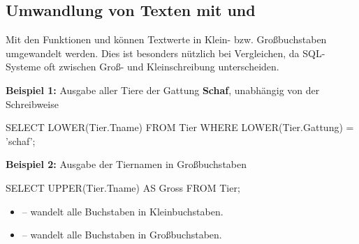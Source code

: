 \subsection{Umwandlung von Texten mit  und }

Mit den Funktionen  und  können Textwerte in Klein- bzw. Großbuchstaben umgewandelt werden. 
Dies ist besonders nützlich bei Vergleichen, da SQL-Systeme oft zwischen Groß- und Kleinschreibung unterscheiden.

\textbf{Beispiel 1:} Ausgabe aller Tiere der Gattung \textbf{Schaf}, unabhängig von der Schreibweise
    \begin{sql}
        SELECT LOWER(Tier.Tname)
            FROM Tier
            WHERE LOWER(Tier.Gattung) = 'schaf';
    \end{sql}

\textbf{Beispiel 2:} Ausgabe der Tiernamen in Großbuchstaben
    \begin{sql}
    SELECT UPPER(Tier.Tname) AS Gross
        FROM Tier;
    \end{sql}

\begin{tcolorbox}[blue={Hinweis}]
    \begin{itemize}
        \item {} – wandelt alle Buchstaben in Kleinbuchstaben.
        \item {} – wandelt alle Buchstaben in Großbuchstaben.
    \end{itemize}
\end{tcolorbox}

